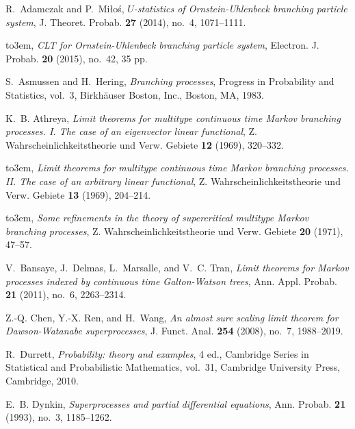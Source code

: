 \documentclass[12pt,a4paper]{amsart}
\theoremstyle{plain}
\theoremstyle{definition}
\numberwithin{equation}{section}
\begin{document}
\providecommand{\bysame}{\leavevmode\hbox to3em{\hrulefill}\thinspace}
\begin{thebibliography}{10}

R.~Adamczak and P.~Mi{\l}o\'{s}, \emph{{$U$}-statistics of
  {O}rnstein-{U}hlenbeck branching particle system}, J. Theoret. Probab.
  \textbf{27} (2014), no.~4, 1071--1111.

\bysame, \emph{C{LT} for {O}rnstein-{U}hlenbeck branching particle system},
  Electron. J. Probab. \textbf{20} (2015), no.~42, 35 pp.

S.~Asmussen and H.~Hering, \emph{Branching processes}, Progress in Probability
  and Statistics, vol.~3, Birkh\"{a}user Boston, Inc., Boston, MA, 1983.

K.~B. Athreya, \emph{Limit theorems for multitype continuous time {M}arkov
  branching processes. {I}. {T}he case of an eigenvector linear functional}, Z.
  Wahrscheinlichkeitstheorie und Verw. Gebiete \textbf{12} (1969), 320--332.

\bysame, \emph{Limit theorems for multitype continuous time {M}arkov branching
  processes. {II}. {T}he case of an arbitrary linear functional}, Z.
  Wahrscheinlichkeitstheorie und Verw. Gebiete \textbf{13} (1969), 204--214.

\bysame, \emph{Some refinements in the theory of supercritical multitype
  {M}arkov branching processes}, Z. Wahrscheinlichkeitstheorie und Verw.
  Gebiete \textbf{20} (1971), 47--57.

V.~Bansaye, J.~Delmas, L.~Marsalle, and V.~C. Tran, \emph{Limit theorems for
  {M}arkov processes indexed by continuous time {G}alton-{W}atson trees}, Ann.
  Appl. Probab. \textbf{21} (2011), no.~6, 2263--2314. 

Z.-Q. Chen, Y.-X. Ren, and H.~Wang, \emph{An almost sure scaling limit theorem
  for {D}awson-{W}atanabe superprocesses}, J. Funct. Anal. \textbf{254} (2008),
  no.~7, 1988--2019.

R.~Durrett, \emph{Probability: theory and examples}, 4 ed., Cambridge Series in
  Statistical and Probabilistic Mathematics, vol.~31, Cambridge University
  Press, Cambridge, 2010.

E.~B. Dynkin, \emph{Superprocesses and partial differential equations}, Ann.
  Probab. \textbf{21} (1993), no.~3, 1185--1262.


\end{thebibliography}
\end{document}
